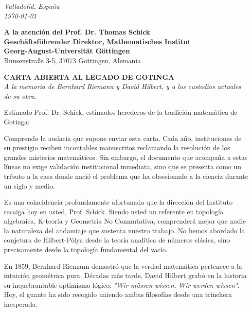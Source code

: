 \documentclass[12pt,a4paper]{article}
\begin{document}
\thispagestyle{empty}

\begin{flushright}
\textit{Valladolid, España}\\
\textit{\today}
\end{flushright}

\vspace{1cm}

\noindent
\textbf{A la atención del Prof. Dr. Thomas Schick}\\
\textbf{Geschäftsführender Direktor, Mathematisches Institut}\\
\textbf{Georg-August-Universität Göttingen}\\
Bunsenstraße 3-5, 37073 Göttingen, Alemania

\vspace{1cm}

\begin{center}
\Large \textbf{CARTA ABIERTA AL LEGADO DE GOTINGA} \\
\vspace{0.2cm}
\normalsize \textit{A la memoria de Bernhard Riemann y David Hilbert, y a los custodios actuales de su obra.}
\end{center}

\vspace{0.5cm}

\noindent Estimado Prof. Dr. Schick, estimados herederos de la tradición matemática de Gotinga:

\vspace{0.3cm}

Comprendo la audacia que supone enviar esta carta. Cada año, instituciones de su prestigio reciben incontables manuscritos reclamando la resolución de los grandes misterios matemáticos. Sin embargo, el documento que acompaña a estas líneas no exige validación institucional inmediata, sino que se presenta como un tributo a la casa donde nació el problema que ha obsesionado a la ciencia durante un siglo y medio.

Es una coincidencia profundamente afortunada que la dirección del Instituto recaiga hoy en usted, Prof. Schick. Siendo usted un referente en topología algebraica, K-teoría y Geometría No Conmutativa, comprenderá mejor que nadie la naturaleza del andamiaje que sustenta nuestro trabajo. No hemos abordado la conjetura de Hilbert-Pólya desde la teoría analítica de números clásica, sino precisamente desde la topología fundamental del vacío.

En 1859, Bernhard Riemann demostró que la verdad matemática pertenece a la intuición geométrica pura. Décadas más tarde, David Hilbert grabó en la historia su inquebrantable optimismo lógico: \textit{"Wir müssen wissen. Wir werden wissen"}. Hoy, el guante ha sido recogido uniendo ambas filosofías desde una trinchera inesperada.
\end{document}
